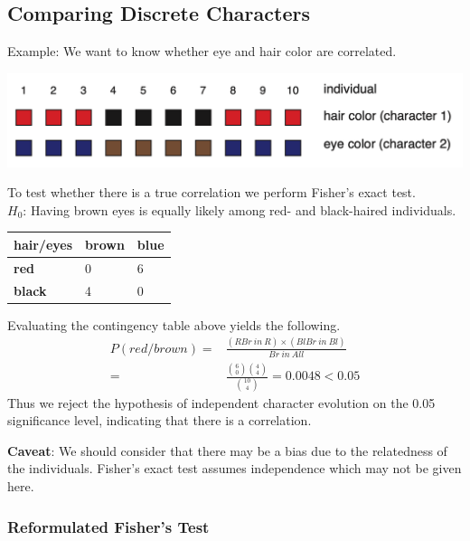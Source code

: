 \documentclass{article}
\begin{document}
\begin{multicols*}{3}
\subsection{Comparing Discrete Characters}

Example: We want to know whether eye and hair color are correlated. 

\begin{center}
    \includegraphics[width=1\linewidth, angle=0.0]{compdischar.png}
\end{center}

To test whether there is a true correlation we perform Fisher's exact test.\\
$H_0$: Having brown eyes is equally likely among red- and black-haired individuals.\\

\begin{tabular}{|l|l|l|}
\hline
\textbf{hair/eyes} & \textbf{brown} & \textbf{blue} \\ \hline
\textbf{red}       & 0              & 6             \\ \hline
\textbf{black}     & 4              & 0             \\ \hline
\end{tabular}

Evaluating the contingency table above yields the following. 
{
\footnotesize
\begin{align*}
P(red/brown) =& \frac{(RBr\ in\ R)\times (BlBr\ in\ Bl)}{Br\ in\ All}\\
=& \frac{{6\choose 0}{4\choose 4}}{{10\choose 4}} = 0.0048 < 0.05
\end{align*}
}
Thus we reject the hypothesis of independent character evolution on the 0.05 significance level, indicating that there is a correlation. 

\textbf{Caveat}: We should consider that there may be a bias due to the relatedness of the individuals. Fisher's exact test assumes independence which may not be given here.\\

\subsubsection{Reformulated Fisher's Test}


\end{multicols*}
\end{document}
